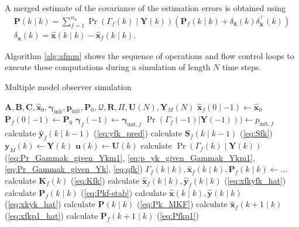A merged estimate of the covariance of the estimation errors is obtained using
\begin{equation} \label{eq:Pk_MKF}
	\begin{aligned}
	\mathbf{P}(k \mid k) = \sum_{f=1}^{n_h} \Pr(\Gamma_f(k) \mid \mathbf{Y}(k)) \left( \mathbf{P}_f(k \mid k) + \delta_\mathbf{\hat{x}}(k) \delta_\mathbf{\hat{x}}^\intercal(k) \right) \\
	\delta_\mathbf{\hat{x}}(k) = \mathbf{\hat{x}}(k \mid k) - \mathbf{\hat{x}}_f(k \mid k).
	\end{aligned}
\end{equation}

Algorithm \ref{alg:afmm} shows the sequence of operations and flow control loops to execute these computations during a simulation of length $N$ time steps.

\begin{algorithm}
	\caption{Multiple model observer simulation}  \label{alg:afmm}
	\begin{algorithmic}
			\Require $\mathbf{A}, \mathbf{B}, \mathbf{C}, \mathbf{\hat{x}}_0, \mathbf{\gamma}_{\text{init}}, \mathbf{p}_{\text{init}}, \mathbf{P}_0, \mathcal{Q}, \mathbf{R}, \Pi, \mathbf{U}(N), \mathbf{Y}_M(N)$
				\State $\mathbf{\hat{x}}_f(0 \mid -1) \gets \mathbf{\hat{x}}_0$
				\State $\mathbf{P}_f(0 \mid -1) \gets \mathbf{P}_0$
				\State $\mathbf{\gamma}_f(-1) \gets \mathbf{\gamma}_{\text{init},f}$
				\State $\Pr(\Gamma_f(-1)|\mathbf{Y}(-1))) \gets p_{\text{init},f}$
			\EndFor
				\State calculate $\mathbf{\hat{y}}_f(k \mid k-1)$ (\ref{eq:yfk_pred}) 
				\State calculate $\mathbf{S}_f(k \mid k-1)$ (\ref{eq:Sfk})
			\EndFor
			\State $\mathbf{y}_M(k) \gets \mathbf{Y}(k)$   %
			\State $\mathbf{u}(k) \gets \mathbf{U}(k)$
				\State calculate $\Pr(\Gamma_f(k) \mid \mathbf{Y}(k))$ (\ref{eq:Pr_Gammak_given_Ykm1}, \ref{eq:p_yk_given_Gammak_Ykm1}, \ref{eq:Pr_Gammak_given_Yk}, \ref{eq:qfk})       %
			\EndFor
			\State $\Gamma_f(k \mid k), \mathbf{\hat{x}}_f(k \mid k), \mathbf{P}_f(k \mid k) \gets ...$   %
				\State calculate $\mathbf{K}_f(k)$ (\ref{eq:Kfk}) 
				\State calculate $\mathbf{\hat{x}}_f(k \mid k), \mathbf{\hat{y}}_f(k \mid k)$ (\ref{eq:xfkyfk_hat})
				\State calculate $\mathbf{P}_f(k \mid k)$ (\ref{eq:Pkf-stab})
			\EndFor
			\State calculate $\mathbf{\hat{x}}(k \mid k), \mathbf{\hat{y}}(k \mid k)$ (\ref{eq:xkyk_hat}) 
			\State calculate $\mathbf{P}(k \mid k)$ (\ref{eq:Pk_MKF})   %
				\State calculate $\mathbf{\hat{x}}_f(k+1 \mid k)$ (\ref{eq:xfkp1_hat}) 
				\State calculate $\mathbf{P}_f(k+1 \mid k)$ (\ref{eq:Pfkp1})
			\EndFor
			\EndFor
		\end{algorithmic}
\end{algorithm}

